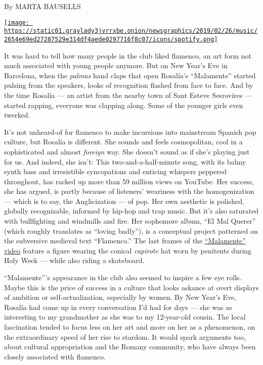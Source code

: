 By MARTA BAUSELLS

\href{https://open.spotify.com/track/1B0BQaSRHxhI0AUlItY3LK}{\texttt{[image: https://static01.graylady3jvrrxbe.onion/newsgraphics/2019/02/26/music/2654e69ed27287529e314df4aede0297716f8c07/icons/spotify.png]}}

It was hard to tell how many people in the club liked flamenco, an art
form not much associated with young people anymore. But on New Year's
Eve in Barcelona, when the \emph{palmas} hand claps that open Rosalía's
``Malamente'' started pulsing from the speakers, looks of recognition
flashed from face to face. And by the time Rosalía --- an artist from
the nearby town of Sant Esteve Sesrovires --- started rapping, everyone
was clapping along. Some of the younger girls even twerked.

It's not unheard-of for flamenco to make incursions into mainstream
Spanish pop culture, but Rosalía is different. She sounds and feels
cosmopolitan, cool in a sophisticated and almost \emph{foreign} way. She
doesn't sound as if she's playing just for us. And indeed, she isn't:
This two-and-a-half-minute song, with its balmy synth bass and
irresistible syncopations and enticing whispers peppered throughout, has
racked up more than 59 million views on YouTube. Her success, she has
argued, is partly because of listeners' weariness with the
homogenization --- which is to say, the Anglicization --- of pop. Her
own aesthetic is polished, globally recognizable, informed by hip-hop
and trap music. But it's also saturated with bullfighting and windmills
and fire. Her sophomore album, ``El Mal Querer'' (which roughly
translates as ``loving badly''), is a conceptual project patterned on
the subversive medieval text ``Flamenca.'' The last frames of the
\href{https://www.youtube.com/watch?v=Rht7rBHuXW8}{``Malamente'' video}
feature a figure wearing the conical \emph{capirote} hat worn by
penitents during Holy Week --- while also riding a skateboard.

``Malamente'''s appearance in the club also seemed to inspire a few eye
rolls. Maybe this is the price of success in a culture that looks
askance at overt displays of ambition or self-actualization, especially
by women. By New Year's Eve, Rosalía had come up in every conversation
I'd had for days --- she was as interesting to my grandmother as she was
to my 12-year-old cousin. The local fascination tended to focus less on
her art and more on her as a phenomenon, on the extraordinary speed of
her rise to stardom. It would spark arguments too, about cultural
appropriation and the Romany community, who have always been closely
associated with flamenco.

